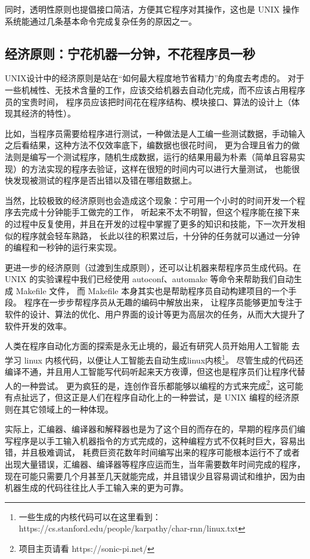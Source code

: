 \documentclass[UTF8]{ctexart}
\begin{document}
        同时，透明性原则也提倡接口简洁，方便其它程序对其操作，这也是 UNIX 操作系统能通过几条基本命令完成复杂任务的原因之一。
    \subsection{经济原则：宁花机器一分钟，不花程序员一秒}
        UNIX设计中的经济原则是站在“如何最大程度地节省精力”的角度去考虑的。
        对于一些机械性、无技术含量的工作，应该交给机器去自动化完成，而不应该占用程序员的宝贵时间，
        程序员应该把时间花在程序结构、模块接口、算法的设计上（体现其经济的特性）。

        比如，当程序员需要给程序进行测试，一种做法是人工编一些测试数据，手动输入之后看结果，这种方法不仅效率底下，编数据也很花时间，
        更为合理且省力的做法则是编写一个测试程序，随机生成数据，运行的结果用最为朴素（简单且容易实现）的方法实现的程序去验证，这样在很短的时间内可以进行大量测试，
        也能很快发现被测试的程序是否出错以及错在哪组数据上。

        当然，比较极致的经济原则也会造成这个现象：宁可用一个小时的时间开发一个程序去完成十分钟能手工做完的工作，
        听起来不太不明智，但这个程序能在接下来的过程中反复使用，并且在开发的过程中掌握了更多的知识和技能，下一次开发相似的程序就会轻车熟路，
        长此以往的积累过后，十分钟的任务就可以通过一分钟的编程和一秒钟的运行来实现。

        更进一步的经济原则（过渡到生成原则），还可以让机器来帮程序员生成代码。在 UNIX 的实验课程中我们已经使用 autoconf、automake 等命令来帮助我们自动生成 Makefile 文件，
        而 Makefile 本身其实也是帮助程序员自动构建项目的一个手段。
        程序在一步步帮程序员从无趣的编码中解放出来，
        让程序员能够更加专注于软件的设计、算法的优化、用户界面的设计等更为高层次的任务，从而大大提升了软件开发的效率。

        人类在程序自动化方面的探索是永无止境的，最近有研究人员开始用人工智能 \cite{CharRNN} \cite{LinuxKernelCode} 去学习 linux 内核代码，以便让人工智能去自动生成linux内核\footnote{一些生成的内核代码可以在这里看到：https://cs.stanford.edu/people/karpathy/char-rnn/linux.txt}。
        尽管生成的代码还编译不通，并且用人工智能写代码听起来天方夜谭，但这也是程序员们让程序代替人的一种尝试。
        更为疯狂的是，连创作音乐都能够以编程的方式来完成\footnote{项目主页请看 https://sonic-pi.net/}，这可能有点扯远了，但这正是人们在程序自动化上的一种尝试，是 UNIX 编程的经济原则在其它领域上的一种体现。

        实际上，汇编器、编译器和解释器也是为了这个目的而存在的，早期的程序员们编写程序是以手工输入机器指令的方式完成的，这种编程方式不仅耗时巨大，容易出错，并且极难调试，
        耗费巨资花数年时间编写出来的程序可能根本运行不了或者出现大量错误，汇编器、编译器等程序应运而生，当年需要数年时间完成的程序，现在可能只需要几个月甚至几天就能完成，并且错误少且容易调试和维护，因为由机器生成的代码往往比人手工输入来的更为可靠。
\end{document}
